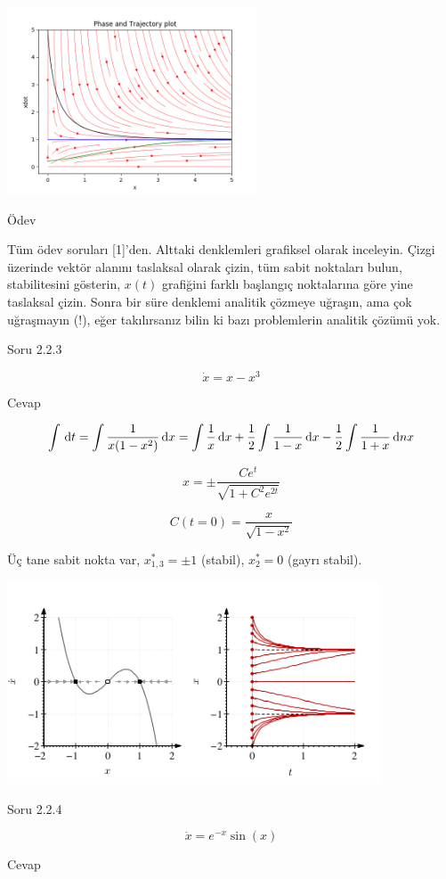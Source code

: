 \documentclass[12pt,fleqn]{article}\usepackage{../../common}
\begin{document}
\includegraphics[width=20em]{03_16.png}


Ödev

Tüm ödev soruları [1]'den. Alttaki denklemleri grafiksel olarak
inceleyin. Çizgi üzerinde vektör alanını taslaksal olarak çizin, tüm sabit
noktaları bulun, stabilitesini gösterin, $x(t)$ grafiğini farklı başlangıç
noktalarına göre yine taslaksal çizin. Sonra bir süre denklemi analitik çözmeye
uğraşın, ama çok uğraşmayın (!), eğer takılırsanız bilin ki bazı problemlerin
analitik çözümü yok.

Soru 2.2.3

$$ \dot{x} = x - x^3 $$

Cevap

$$
\int \,\mathrm{d} t = \int \frac{1}{x(1-x^2)} \,\mathrm{d} x =
\int \frac{1}{x} \,\mathrm{d} x +
\frac{1}{2} \int \frac{1}{1-x} \,\mathrm{d} x -
\frac{1}{2} \int \frac{1}{1+x} \,\mathrm{d} nx
$$

$$ x = \pm \frac{Ce^t}{\sqrt{1 + C^2e^{2t}} } $$

$$ C(t=0) = \frac{x}{\sqrt{1-x^2}} $$

Üç tane sabit nokta var, $x^\ast_{1,3} = \pm 1$ (stabil), $x^\ast_2 = 0$ (gayrı
stabil). 

\includegraphics[height=6cm]{03_09.png}

Soru 2.2.4

$$ \dot{x} = e^{-x}\sin(x) $$

Cevap
\end{document}
